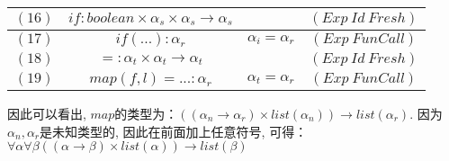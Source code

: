 \documentclass{article}
\begin{document}
\begin{solution}
\begin{table}[H]
\begin{tabular}{|c|c|c|c|}
				\hline
				$(16)$ & $if:boolean \times \alpha_s \times \alpha_s \to \alpha_s$ &  & $(Exp\ Id\ Fresh)$ \\
				\hline
				$(17)$ & $if(...):\alpha_r$ & $\alpha_i = \alpha_r$ & $(Exp\ FunCall)$ \\
				\hline
				$(18)$ & $=:\alpha_t \times \alpha_t \to \alpha_t$ &  & $(Exp\ Id\ Fresh)$ \\
				\hline
				$(19)$ & $map(f, l) = ...:\alpha_r$ & $\alpha_t = \alpha_r$ & $(Exp\ FunCall)$ \\
				\hline
			\end{tabular}
		\end{table}
		因此可以看出, $map$的类型为：$((\alpha_n \to \alpha_r) \times list(\alpha_n)) \to list(\alpha_r)$.\newline
		因为$\alpha_n, \alpha_r$是未知类型的, 因此在前面加上任意符号, 可得：\newline
		$\forall\alpha\forall\beta((\alpha \to \beta) \times list(\alpha)) \to list(\beta)$
	\end{solution}
\end{document}
